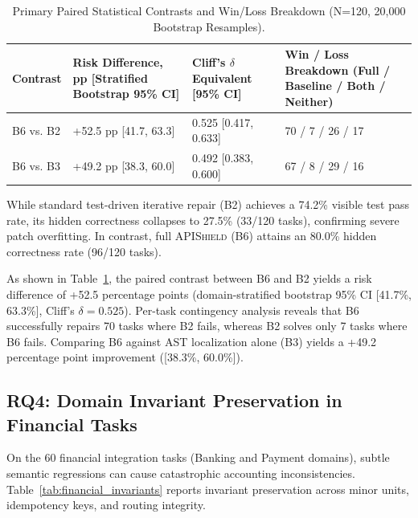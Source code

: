 \begin{table}[t]
\centering\small
\caption{Primary Paired Statistical Contrasts and Win/Loss Breakdown (N=120, 20,000 Bootstrap Resamples).}
\label{tab:contrasts}
\begin{tabular}{llll}
\toprule
Contrast & Risk Difference, pp [Stratified Bootstrap 95\% CI] & Cliff's $\delta$ Equivalent [95\% CI] & Win / Loss Breakdown (Full / Baseline / Both / Neither) \\
\midrule
B6 vs. B2 & +52.5 pp [41.7, 63.3] & 0.525 [0.417, 0.633] & 70 / 7 / 26 / 17 \\
B6 vs. B3 & +49.2 pp [38.3, 60.0] & 0.492 [0.383, 0.600] & 67 / 8 / 29 / 16 \\
\bottomrule
\end{tabular}
\end{table}

While standard test-driven iterative repair (B2) achieves a 74.2\% visible test pass rate, its hidden correctness collapses to 27.5\% (33/120 tasks), confirming severe patch overfitting. In contrast, full \textsc{APIShield} (B6) attains an 80.0\% hidden correctness rate (96/120 tasks). 

As shown in Table~\ref{tab:contrasts}, the paired contrast between B6 and B2 yields a risk difference of +52.5 percentage points (domain-stratified bootstrap 95\% CI [41.7\%, 63.3\%], Cliff's $\delta = 0.525$). Per-task contingency analysis reveals that B6 successfully repairs 70 tasks where B2 fails, whereas B2 solves only 7 tasks where B6 fails. Comparing B6 against AST localization alone (B3) yields a +49.2 percentage point improvement ([38.3\%, 60.0\%]).

\subsection{RQ4: Domain Invariant Preservation in Financial Tasks}
On the 60 financial integration tasks (Banking and Payment domains), subtle semantic regressions can cause catastrophic accounting inconsistencies. Table~\ref{tab:financial_invariants} reports invariant preservation across minor units, idempotency keys, and routing integrity.

